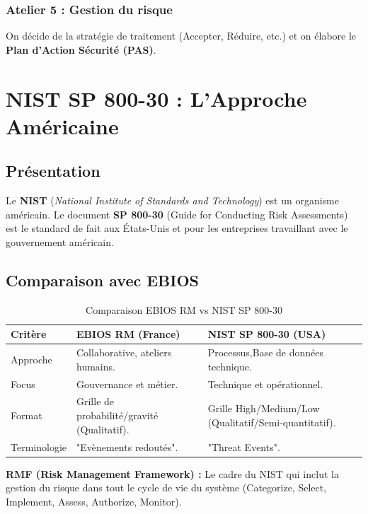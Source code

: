 \subsubsection{Atelier 5 : Gestion du risque}
On décide de la stratégie de traitement (Accepter, Réduire, etc.) et on élabore le \textbf{Plan d'Action Sécurité (PAS)}.

\section{NIST SP 800-30 : L'Approche Américaine}

\subsection{Présentation}

Le \textbf{NIST} (\textit{National Institute of Standards and Technology}) est un organisme américain. Le document \textbf{SP 800-30} (Guide for Conducting Risk Assessments) est le standard de fait aux États-Unis et pour les entreprises travaillant avec le gouvernement américain.

\subsection{Comparaison avec EBIOS}

\begin{table}[htbp]
\centering
\begin{tabular}{p{3cm}p{5cm}p{5cm}}
    \toprule
    \textbf{Critère} & \textbf{EBIOS RM (France)} & \textbf{NIST SP 800-30 (USA)} \\
    \midrule
    Approche & Collaborative, ateliers humains. & Processus,Base de données technique. \\
    Focus & Gouvernance et métier. & Technique et opérationnel. \\
    Format & Grille de probabilité/gravité (Qualitatif). & Grille High/Medium/Low (Qualitatif/Semi-quantitatif). \\
    Terminologie & "Evènements redoutés". & "Threat Events". \\
    \bottomrule
\end{tabular}
\caption{Comparaison EBIOS RM vs NIST SP 800-30}
\end{table}

\begin{boxdef}
\textbf{RMF (Risk Management Framework) :} Le cadre du NIST qui inclut la gestion du risque dans tout le cycle de vie du système (Categorize, Select, Implement, Assess, Authorize, Monitor).
\end{boxdef}

